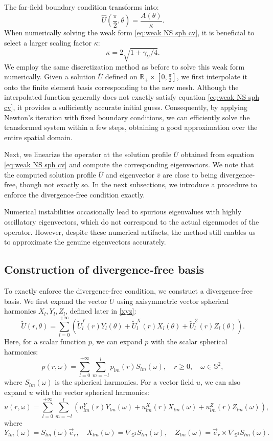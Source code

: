 \documentclass[11pt,a4paper]{article}
\numberwithin{equation}{section}
\begin{document}
The far-field boundary condition transforms into:
\[ \widehat{U} \left( \frac{\pi}{2}, \theta \right) = \frac{A (\theta)}{\kappa} .
\]
When numerically solving the weak form \eqref{eq:weak NS sph cv}, it is
beneficial to select a larger scaling factor $\kappa$:
\[ \kappa = 2 \sqrt{1 + \gamma_U / 4}. \]
We employ the same discretization method as before to solve this weak form
numerically. Given a solution $\overline{U}$ defined on $\mathbb{R}_+ \times
\left[ 0, \frac{\pi}{2} \right]$, we first interpolate it onto the finite
element basis corresponding to the new mesh. Although the interpolated
function generally does not exactly satisfy equation \eqref{eq:weak NS sph
cv}, it provides a sufficiently accurate initial guess. Consequently, by
applying Newton's iteration with fixed boundary conditions, we can efficiently
solve the transformed system within a few steps, obtaining a good
approximation over the entire spatial domain.

Next, we linearize the operator at the solution profile $\overline{U}$
obtained from equation \eqref{eq:weak NS sph cv} and compute the corresponding
eigenvectors. We note that the computed solution profile $\overline{U}$ and
eigenvector $\overline{v}$ are close to being divergence-free, though not exactly
so. In the next subsections, we introduce a procedure to enforce the
divergence-free condition exactly.

\begin{remark}
  Numerical instabilities occasionally lead to spurious eigenvalues with
  highly oscillatory eigenvectors, which do not correspond to  the actual
  eigenmodes of the operator. However, despite these numerical artifacts, the
  method still enables us to approximate the genuine eigenvectors accurately.
\end{remark}

\subsection{Construction of divergence-free basis}\label{sec:div-free}

To exactly enforce the divergence-free condition, we construct a
divergence-free basis. We first expand the vector $\widetilde{U}$ using axisymmetric vector spherical harmonics $X_l, Y_l, Z_l$, defined later in \eqref{xyz}:
\[ \widetilde{U} (r, \theta) = \sum_{l = 0}^{+ \infty} (\widetilde{U}_l^Y (r) Y_l
   (\theta) + \widetilde{U}_l^X (r) X_l (\theta) + \widetilde{U}_l^Z (r) Z_l (\theta))
   . \]
    Here, for a scalar function $p$, we can expand $p$ with the scalar spherical harmonics:
\[ p (r, \omega) = \sum_{l = 0}^{+ \infty} \sum_{m = - l}^l p_{l m} (r) S_{l
   m} (\omega), \quad r \geqslant 0, \quad \omega \in \mathbb{S}^2 , \]
where $S_{l m} (\omega)$ is the spherical harmonics. For a vector field $u$,
we can also expand $u$ with the vector spherical harmonics:
\[ u (r, \omega) = \sum_{l = 0}^{+ \infty} \sum_{m = - l}^l (u_{l m}^Y (r)
   Y_{l m} (\omega) + u_{l m}^X (r) X_{l m} (\omega) + u_{l m}^Z (r) Z_{l m}
   (\omega)), \]
where
\[ Y_{l m} (\omega) = S_{l m} (\omega) \vec{e}_r, \quad X_{l m} (\omega) = \nabla_{\mathbb{S}^2}
   S_{l m} (\omega), \quad Z_{l m} (\omega) = \vec{e}_r \times \nabla_{\mathbb{S}^2} S_{l m}
   (\omega) . \]
   
\end{document}
